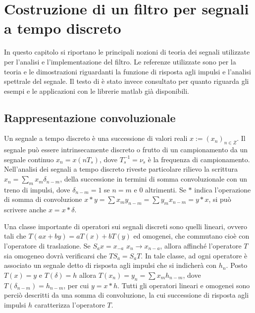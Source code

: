 

\chapter{Costruzione di un filtro per segnali a tempo discreto}
\label{segnali}

\graphicspath{{Graph/}}

In questo capitolo si riportano le principali nozioni di teoria dei segnali utilizzate per l'analisi e l'implementazione del filtro. Le referenze utilizzate sono \cite{Oppenheim1998} per la teoria e le dimostrazioni riguardanti la funzione di risposta agli impulsi e l'analisi spettrale del segnale. Il testo di 
\cite{Diniz2010} è stato invece consultato per quanto riguarda gli esempi e le applicazioni con le librerie matlab già disponibili.



\section{Rappresentazione convoluzionale}

Un segnale a tempo discreto è una successione di valori reali $x:=(x_{n})_{n\in Z}$. Il segnale può essere intrinsecamente discreto o frutto di un campionamento da un segnale continuo $x_{n} = x(nT_{s})$, dove $T_{s}^{-1} = \nu_{s}$ è la frequenza di campionamento. Nell'analisi dei segnali a tempo discreto riveste particolare rilievo la scrittura $x_{n} = \sum_{m} x_{m}\delta_{n-m}$, della successione in termini di somma convoluzionale con un treno di impulsi, dove $\delta_{n-m}=1$ se $n=m$ e $0$ altrimenti. Se $*$ indica l'operazione di somma di convoluzione $x*y = \sum x_{m}y_{n-m} = \sum y_{m}x_{n-m} = y*x$, si può scrivere anche $x=x*\delta$.

Una classe importante di operatori sui segnali discreti sono quelli lineari, ovvero tali che $ T(ax+by) = aT(x)+bT(y) $ ed omogenei, che commutano cioè con l'operatore di traslazione. Se $ S_{a}x = x_{-a}$ $x_{n}\rightarrow x_{n-a}$, allora affinché l'operatore $T$ sia omogeneo dovrà verificarsi che $TS_{a} = S_{a}T$. In tale classe, ad ogni operatore è associato un segnale detto di risposta agli impulsi che si indicherà con $h_{n}$. Posto$T(x)=y$ e $T(\delta) = h$ allora $T(x_{n}) = y_{n} = \sum x_{m}h_{n-m}$, dove $T(\delta_{n-m}) = h_{n-m}$, per cui $y=x*h$. Tutti gli operatori lineari e omogenei sono perciò descritti da una somma di convoluzione, la cui successione di risposta agli impulsi $h$ caratterizza l'operatore $T$.


